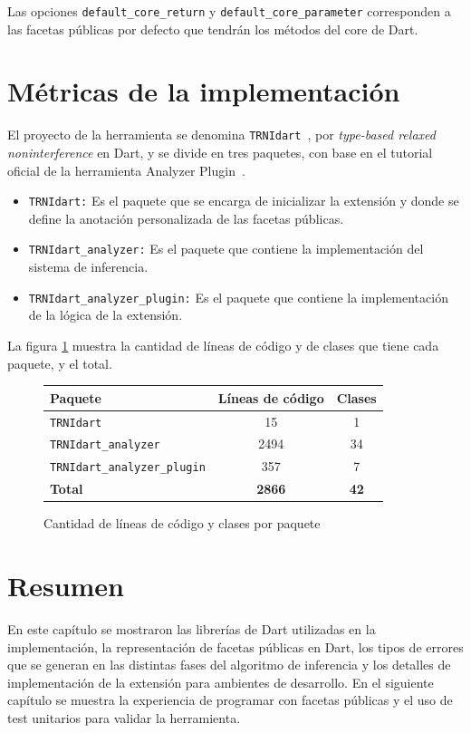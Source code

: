 Las opciones \texttt{default\_core\_return} y \texttt{default\_core\_parameter} corresponden a las facetas públicas por defecto que tendrán los métodos del core de Dart.

\section{Métricas de la implementación}
El proyecto de la herramienta se denomina \texttt{TRNIdart}~\cite{repo}, por \emph{type-based relaxed noninterference} en Dart, y se divide en tres paquetes, con base en el tutorial oficial de la herramienta Analyzer Plugin~\cite{plugin}.
\clearpage
\begin{itemize}
  \item \texttt{TRNIdart:} Es el paquete que se encarga de inicializar la extensión y donde se define la anotación personalizada de las facetas públicas.
  \item \texttt{TRNIdart\_analyzer:} Es el paquete que contiene la implementación del sistema de inferencia.
  \item \texttt{TRNIdart\_analyzer\_plugin:} Es el paquete que contiene la implementación de la lógica de la extensión.
\end{itemize}
La figura \ref{metricas} muestra la cantidad de líneas de código y de clases que tiene cada paquete, y el total.

\begin{figure}[ht]
  \centering
  \begin{tabular}{l|c|c}
    \textbf{Paquete} & \textbf{Líneas de código} & \textbf{Clases}\\
    \hline
    \texttt{TRNIdart} & 15 & 1\\
    \texttt{TRNIdart\_analyzer} & 2494 & 34\\
    \texttt{TRNIdart\_analyzer\_plugin} & 357 & 7\\
    \hline
    \textbf{Total} & \textbf{2866} & \textbf{42}
  \end{tabular}
  \caption{Cantidad de líneas de código y clases por paquete}
  \label{metricas}
\end{figure}

\section*{Resumen}

En este capítulo se mostraron las librerías de Dart utilizadas en la implementación, la representación de facetas públicas en Dart, los tipos de errores que se generan en las distintas fases del algoritmo de inferencia y los detalles de implementación de la extensión para ambientes de desarrollo. En el siguiente capítulo se muestra la experiencia de programar con facetas públicas y el uso de test unitarios para validar la herramienta.
